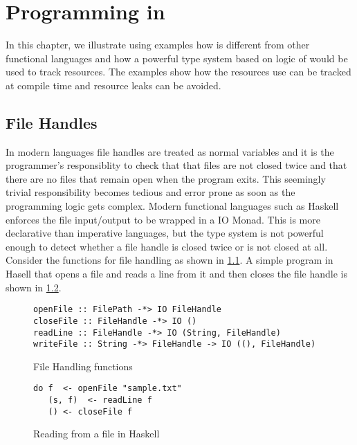 \chapter{Programming in \qub{}}
In this chapter, we illustrate using examples how \qub{} is different
from other functional languages and how a powerful type system based on logic of \BI
would be used to track resources. The examples show how the resources use
can be tracked at compile time and resource leaks can be avoided.

\section{File Handles}\label{sec:file-handle-example}
In modern languages file handles are treated as normal variables
and it is the programmer's responsiblity to check that that files are not closed twice
and that there are no files that remain open when the program exits. This seemingly trivial
responsibility becomes tedious and error prone as soon as the programming logic gets complex.
Modern functional languages such as Haskell enforces the file input/output to be wrapped in a IO Monad.
This is more declarative than imperative languages, but the type system is not powerful enough
to detect whether a file handle is closed twice or is not closed at all.
Consider the functions for file handling as shown in \cref{fig:file-handling-function}. A simple program in Hasell that opens a file and reads
a line from it and then closes the file handle is shown in \cref{fig:file-read-close}.

\begin{figure}[h]
  \begin{framed}
    \begin{verbatim}
openFile :: FilePath -*> IO FileHandle
closeFile :: FileHandle -*> IO ()
readLine :: FileHandle -*> IO (String, FileHandle)
writeFile :: String -*> FileHandle -> IO ((), FileHandle)
    \end{verbatim}
  \end{framed}
  \caption{File Handling functions}
  \label{fig:file-handling-function}
\end{figure}

\begin{figure}[h]
  \begin{framed}
    \begin{verbatim}
do f  <- openFile "sample.txt"
   (s, f)  <- readLine f
   () <- closeFile f
    \end{verbatim}
  \end{framed}
  \caption{Reading from a file in Haskell}
  \label{fig:file-read-close}
\end{figure}

